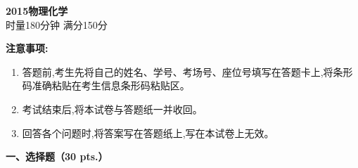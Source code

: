 \begin{center}
    {\LARGE \textbf{2015物理化学}} \\[2ex]
    {\large 时量180分钟 \quad 满分150分}
\end{center}

\vspace{0.5cm}
\noindent\textbf{注意事项:}
\begin{enumerate}[label=\arabic*., parsep=0pt, itemsep=0pt]
    \item 答题前,考生先将自己的姓名、学号、考场号、座位号填写在答题卡上,将条形码准确粘贴在考生信息条形码粘贴区。
    \item 考试结束后,将本试卷与答题纸一并收回。
    \item 回答各个问题时,将答案写在答题纸上,写在本试卷上无效。
\end{enumerate}

\vspace{0.5cm}
\noindent\textbf{一、选择题（30 pts.）}

